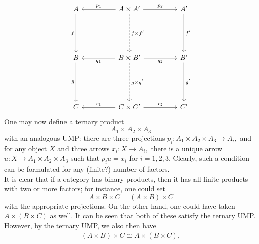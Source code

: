 \begin{equation} \label{diag:prodcomp}
	\begin{tikzcd}
A \arrow[ddd, "f"'] &  & A \times A' \arrow[ll, "p_1"'] \arrow[rr, "p_2"] \arrow[ddd, "f\times f'", dashed] &  & A' \arrow[ddd, "f'"] \\
                    &  &                                                                                    &  &                      \\
                    &  &                                                                                    &  &                      \\
B \arrow[ddd, "g"'] &  & B\times B' \arrow[ll, "q_1"] \arrow[rr, "q_2"'] \arrow[ddd, "g\times g'", dashed]  &  & B' \arrow[ddd, "g'"] \\
                    &  &                                                                                    &  &                      \\
                    &  &                                                                                    &  &                      \\
C                   &  & C\times C' \arrow[ll, "r_1"'] \arrow[rr, "r_2"]                                    &  & C'                  
\end{tikzcd}
\end{equation}
One may now define a ternary product
\begin{equation*} 
	A_1 \times A_2 \times A_3
\end{equation*}
with an analogous UMP: there are three projections $p_i:A_1 \times A_2 \times A_3 \to A_i,$ and for any object $X$ and three arrows $x_i:X\to A_i,$ there is a unique arrow $u:X\to A_1\times A_2 \times A_3$ such that $p_iu = x_i$ for $i = 1, 2, 3.$ Clearly, such a condition can be formulated for any (finite?) number of factors.\\
It is clear that if a category has binary products, then it has all finite products with two or more factors; for instance, one could set
\begin{equation*} 
	A \times B \times C = (A \times B) \times C
\end{equation*}
with the appropriate projections. On the other hand, one could have taken $A \times (B \times C)$ as well. It can be seen that both of these satisfy the ternary UMP. However, by the ternary UMP, we also then have
\begin{align*} 
	(A \times B) \times C \cong A \times (B \times C),
\end{align*}
